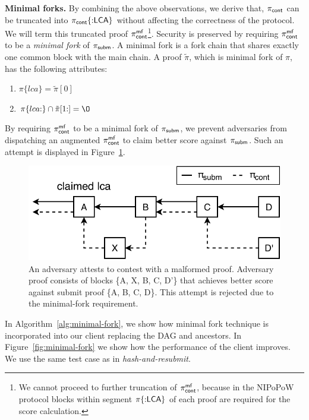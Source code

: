 \noindent \textbf{Minimal forks.} By combining the above observations, we
derive that, $\mathsf{\pi_{cont}}$ can be truncated into $\mathsf{\pi_{cont}}\{{:}\mathsf{LCA}\}$ without
affecting the correctness of the protocol. We will term this truncated proof
$\mathsf{\pi_{cont}^{mf}}$\footnote{We cannot proceed to further truncation of $\mathsf{\pi_{cont}^{mf}}$, because
in the NIPoPoW protocol blocks within segment $\pi\{{:}\mathsf{LCA}\}$ of each proof
are required for the score calculation.}. Security is preserved by requiring
$\mathsf{\pi_{cont}^{mf}}$ to be a \emph{minimal fork} of $\mathsf{\pi_{subm}}$. A minimal fork is a fork chain
that shares exactly one common block with the main chain. A proof $\tilde\pi$,
which is minimal fork of $\pi$, has the following attributes:

\begin{enumerate}
\item $\pi\{lca\} = \tilde\pi[0]$
\item $\pi\{lca{:}\} \cap \tilde\pi[1{:}] = \O$
\end{enumerate}

By requiring $\mathsf{\pi_{cont}^{mf}}$ to be a minimal fork of $\mathsf{\pi_{subm}}$, we prevent adversaries
from dispatching an augmented $\mathsf{\pi_{cont}^{mf}}$ to claim better score against $\mathsf{\pi_{subm}}$.
Such an attempt is displayed in Figure~\ref{fig:adversary-minimal-fork}.

\begin{figure}[h]
    \begin{center}
        \includegraphics[width=0.85\columnwidth]{figures/adversary-minimal-fork.pdf}
    \end{center}

    \caption{An adversary attests to contest with a malformed proof. Adversary
        proof consists of blocks \{A, X, B, C, D'\} that achieves better score
        against submit proof \{A, B, C, D\}. This attempt is rejected due to
        the minimal-fork requirement.}

    \label{fig:adversary-minimal-fork}
\end{figure}

In Algorithm~\ref{alg:minimal-fork}, we show how minimal fork technique is
incorporated into our client replacing the DAG and ancestors. In
Figure~\ref{fig:minimal-fork} we show how the performance of the client
improves. We use the same test case as in \emph{hash-and-resubmit}.

